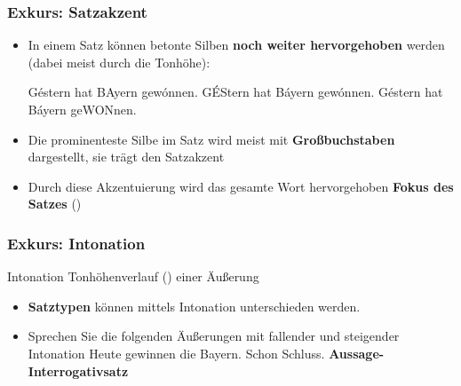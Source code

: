 \begin{frame}
\frametitle{Exkurs: Satzakzent}

\begin{itemize}
	\item In einem Satz können betonte Silben \textbf{noch weiter hervorgehoben} werden (dabei meist durch die Tonhöhe):
	
	\eal 
	\ex Géstern hat BAyern gewónnen.
	\ex GÉStern hat Báyern gewónnen.
	\ex Géstern hat Báyern geWONnen.
	\zl
	\item Die prominenteste Silbe im Satz wird meist mit \textbf{Großbuchstaben} dargestellt, sie trägt den Satzakzent

	\item Durch diese Akzentuierung wird das gesamte Wort
hervorgehoben \ras \textbf{Fokus des Satzes} ()
	
\end{itemize}

\end{frame}




\begin{frame}
\frametitle{Exkurs: Intonation}

\begin{block}{Intonation}
Tonhöhenverlauf () einer Äußerung
\end{block}

\begin{itemize}
	\item \textbf{Satztypen} können mittels Intonation unterschieden werden.
	
	\item Sprechen Sie die folgenden Äußerungen mit fallender und steigender Intonation
	\eal 
	\ex Heute gewinnen die Bayern.
	\ex Schon Schluss.
        \zl
\pause
	\textbf{Aussage-} \vs \textbf{Interrogativsatz}	
	
\end{itemize}

\end{frame}



